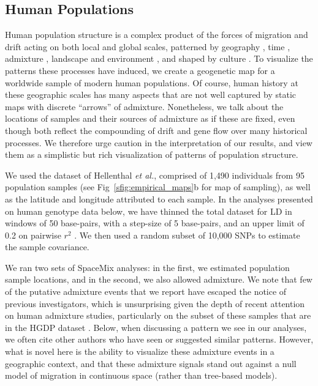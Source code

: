 \documentclass[10pt,letterpaper]{article}
\begin{document}
\subsection*{Human Populations}
Human population structure is a complex product of the forces of migration and drift acting on both local and global scales, patterned by geography \cite{novembre_genes_2008, ralph2013geography}, time \cite{skoglund2012origins, skoglund_investigating_2014}, admixture \cite{Hellenthal},  landscape and environment \cite{Beall2010, Bigham2010, Bradburd2013}, and shaped by culture \cite{reich_india_2009, Atzmon2010, moorjani_history_2011}. To visualize the patterns these processes have induced, we create a geogenetic map for a worldwide sample of modern human populations. 
Of course, human history at these geographic scales has many aspects that are not well captured by 
static maps with discrete ``arrows'' of admixture.
Nonetheless, we talk about the locations of samples and their sources of admixture as if these are fixed,
even though both reflect the compounding of drift and gene flow over many historical processes.  
We therefore urge caution in the interpretation of our results, 
and view them as a simplistic but rich visualization of patterns of population structure.

We used the dataset of Hellenthal \emph{et al.}\cite{Hellenthal}, 
comprised of 1,490 individuals from 95 population samples (see Fig\ \ref{sfig:empirical_maps}b for map of sampling), as well as the latitude and longitude attributed to each sample.  
In the analyses presented on human genotype data below, we have thinned the total dataset for LD in windows of 50 base-pairs, with a step-size of 5 base-pairs, and an upper limit of 0.2 on pairwise $r^2$ \cite{Purcell_etal_2007,plink}.  We then used a random subset of 10,000 SNPs to estimate the sample covariance.

We ran two sets of SpaceMix analyses: in the first, we estimated population sample locations, 
and in the second, we also allowed admixture. 
We note that few of the putative admixture events that we report have escaped the notice of previous investigators, 
which is unsurprising given the depth of recent attention on human admixture studies, particularly on the subset of these samples that are in the HGDP dataset
\cite{rosenberg_genetic_2002,li_worldwide_2008,Loh:13,patterson_ancient_2012,Hellenthal}. 
Below, when discussing a pattern we see in our analyses, we often cite other authors who have seen or suggested similar patterns.
However, what is novel here is the ability to visualize these admixture events in a geographic context, 
and that these admixture signals stand out against a null model of migration in continuous space (rather than tree-based models).
\end{document}
